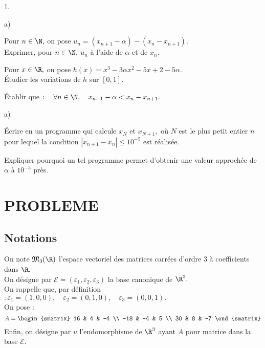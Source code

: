\documentclass[11pt]{article}%
\begin{document}
\begin{noliste}{1.}
\begin{noliste}{a)}
 \setlength{\itemsep}{2mm}
\item Pour $n\in \N,$ on pose $u_{n} = (x_{n + 1}-\alpha
)-(x_{n}-x_{n + 1}).$\\
Exprimer, pour $n\in \N,$ $u_{n}$ à l'aide de $\alpha $ et de $x_{n}. $

\item Pour $x\in \R,$ on pose $h(x) = x^{3}-3\alpha x^{2}-5x +
2-5\alpha.$\\
Étudier les variations de $h$ sur $[0,1].$

\item Établir que $ :\quad \forall n\in \N,\quad x_{n + 1}-\alpha
<x_{n}-x_{n + 1}.$
\end{noliste}

\item 

\begin{noliste}{a)}
 \setlength{\itemsep}{2mm}
\item Écrire en \Scilab{} un programme qui calcule $x_{N}$ et $x_{N +
1},$ où $N$
est le plus petit entier $n$ pour lequel la condition $\left|
x_{n + 1}-x_{n}\right| \leq 10^{-5}$ est réalisée.

\item Expliquer pourquoi un tel programme permet d'obtenir une valeur
approchée de $\alpha $ à $10^{-5}$ près.
\end{noliste}
\end{noliste}

\section*{PROBLEME}

\subsection*{Notations}

On note $\mathfrak{M}_{3}(\R)$ l'espace vectoriel des matrices carrées
d'ordre $3$ à coefficients dans $\R.$\\
On désigne par $\mathcal{E} =
(\varepsilon_{1},\varepsilon_{2},\varepsilon
_{3})$ la base canonique de $\R^{3}.$\\
On rappelle que, par définition $ :\varepsilon_{1} = (1,0,0),\quad
\varepsilon
_{2} = (0,1,0),\quad \varepsilon_{3} = (0,0,1).$\\
On pose : 
\[
A = 
\begin{smatrix}
16 & 4 & -4 \\
-18 & -4 & 5 \\
30 & 8 & -7
\end{smatrix}
\]
Enfin, on désigne par $u$ l'endomorphisme de $\R^{3}$ ayant $A$ pour
matrice dans la base $\mathcal{E}.$
\end{document}
